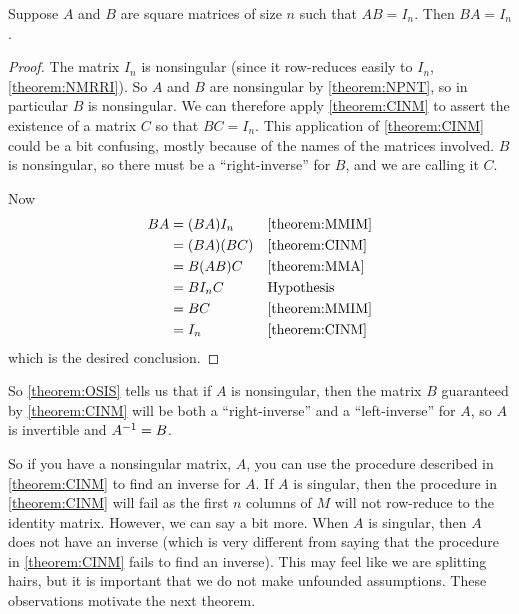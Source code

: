 \documentclass{ximera}
\begin{document}
\begin{theorem}
  \label{theorem:OSIS}

  Suppose $A$ and $B$ are  square matrices of size $n$ such that $AB=I_n$.  Then $BA=I_n$.

  \begin{proof}
    The matrix $I_n$ is nonsingular (since it row-reduces easily to
    $I_n$, \ref{theorem:NMRRI}).  So $A$ and $B$ are nonsingular by
    \ref{theorem:NPNT}, so in particular $B$ is nonsingular.  We can
    therefore apply \ref{theorem:CINM} to assert the existence of a
    matrix $C$ so that $BC=I_n$.  This application of
    \ref{theorem:CINM} could be a bit confusing, mostly because of the
    names of the matrices involved.  $B$ is nonsingular, so there must
    be a ``right-inverse'' for $B$, and we are calling it $C$.

    Now
    \begin{align*}
      BA
      &=(BA)I_n&&\ref{theorem:MMIM}\\
      &=(BA)(BC)&&\ref{theorem:CINM}\\
      &=B(AB)C&&\ref{theorem:MMA}\\
      &=BI_nC&&\text{Hypothesis}\\
      &=BC&&\ref{theorem:MMIM}\\
      &=I_n&&\ref{theorem:CINM}
    \end{align*}
    which is the desired conclusion.
  \end{proof}
\end{theorem}

So \ref{theorem:OSIS} tells us that if $A$ is nonsingular, then the
matrix $B$ guaranteed by \ref{theorem:CINM} will be both a
``right-inverse'' and a ``left-inverse'' for $A$, so $A$ is invertible
and $A^{-1}=B$.

So if you have a nonsingular matrix, $A$, you can use the procedure
described in \ref{theorem:CINM} to find an inverse for $A$.  If $A$ is
singular, then the procedure in \ref{theorem:CINM} will fail as the
first $n$ columns of $M$ will not row-reduce to the identity matrix.
However, we can say a bit more.  When $A$ is singular, then $A$ does
not have an inverse (which is very different from saying that the
procedure in \ref{theorem:CINM} fails to find an inverse).  This may
feel like we are splitting hairs, but it is important that we do not
make unfounded assumptions.  These observations motivate the next
theorem.
\end{document}
